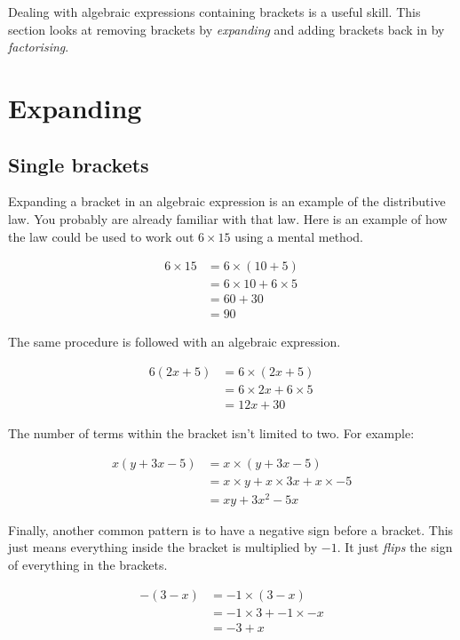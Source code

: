 \documentclass[
  a4paper,
]{scrbook}
\begin{document}
Dealing with algebraic expressions containing brackets is a useful
skill. This section looks at removing brackets by \emph{expanding} and
adding brackets back in by \emph{factorising}.

\section{Expanding}\label{expanding}

\subsection{Single brackets}\label{single-brackets}

Expanding a bracket in an algebraic expression is an example of the
distributive law. You probably are already familiar with that law. Here
is an example of how the law could be used to work out \(6 \times 15\)
using a mental method.

\[
\begin{aligned} 
6 \times 15 &= 6 \times (10 + 5)\\
&= 6 \times 10 + 6 \times 5\\
&= 60 + 30\\
&= 90 
\end{aligned}
\]

The same procedure is followed with an algebraic expression.

\[
\begin{aligned} 
6(2x+5) &= 6 \times (2x + 5) \\
&= 6 \times 2x + 6 \times 5 \\
&= 12x + 30
\end{aligned}
\]

The number of terms within the bracket isn't limited to two. For
example:

\[
\begin{aligned} x(y + 3x -5) &= x \times (y + 3x -5) \\
&= x \times y + x \times 3x + x \times -5\\
&= xy + 3x^2 - 5x
\end{aligned}
\]

Finally, another common pattern is to have a negative sign before a
bracket. This just means everything inside the bracket is multiplied by
\(-1\). It just \emph{flips} the sign of everything in the brackets.

\[
\begin{aligned} -(3-x) &= -1 \times (3-x) \\
&= -1 \times 3 + -1 \times -x \\
&= -3+ x
\end{aligned}
\]
\end{document}
